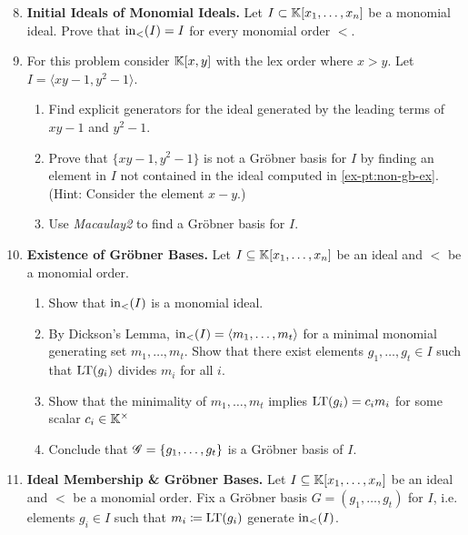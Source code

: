 \documentclass[12pt,reqno]{amsart}
\begin{document}
\begin{enumerate}[leftmargin=*]
\setcounter{enumi}{7}

\item \textbf{Initial Ideals of Monomial Ideals.} Let $I \subset \mathbb{K}[x_1,\ldots,x_n]$ be a monomial ideal. Prove that $\operatorname{in}_{<}(I)=I$ for every monomial order $<$. 

\item For this problem consider $\mathbb{K}[x,y]$ with the lex order where $x>y$.  Let $I=\langle xy-1, y^2-1\rangle$.
\begin{enumerate}[label=(\alph*),ref=\theenumi\alph*]
	\item\label{ex-pt:non-gb-ex} Find explicit generators for the ideal generated by the leading terms of $xy-1$ and $y^2-1$.
	\item Prove that $\{xy-1, y^2-1\}$ is not a Gr\"{o}bner basis for $I$ by finding an element in $I$ not contained in the ideal computed in \ref{ex-pt:non-gb-ex}. (Hint: Consider the element $x-y$.)
	\item Use \textit{Macaulay2} to find a Gr\"{o}bner basis for $I$.
 \end{enumerate}

\item \textbf{Existence of Gr\"{o}bner Bases.} Let $I\subseteq \mathbb{K}[x_1,\ldots,x_n]$ be an ideal and $<$ be a monomial order.  
\begin{enumerate}[label=(\alph*),ref=\theenumi\alph*]
	\item Show that $\operatorname{in}_{<}(I)$ is a monomial ideal. 
	\item By Dickson's Lemma,  $\operatorname{in}_{<}(I)=\langle m_1,\ldots,m_t\rangle$ for a minimal monomial generating set $m_1,\ldots,m_t$. Show that there exist  elements $g_{1},\ldots,g_{t} \in I$ such that $\operatorname{LT}(g_i)$ divides $m_i$ for all $i$. 
	\item Show that the minimality of $m_1,\ldots,m_t$ implies $\operatorname{LT}(g_i) = c_im_i$  for some scalar $c_i\in \mathbb{K}^{\times}$
	\item Conclude that $\mathcal{G}=\{g_1,\ldots,g_t\}$ is a Gr\"{o}bner basis of $I$. 
\end{enumerate}
   

\item \textbf{Ideal Membership \& Gr\"obner Bases.} Let $I\subseteq \mathbb{K}[x_1,\ldots,x_n]$ be an ideal and $<$ be a monomial order. Fix a Gr\"{o}bner basis $G=(g_1,\ldots,g_t)$ for $I$, i.e. elements $g_i \in I$ such that $m_i \coloneqq \operatorname{LT}(g_i)$ generate $\operatorname{in}_{<}(I)$.
\begin{enumerate}[label=(\alph*),ref=\theenumi\alph*]
 

\end{enumerate}
\end{enumerate}
\end{document}
